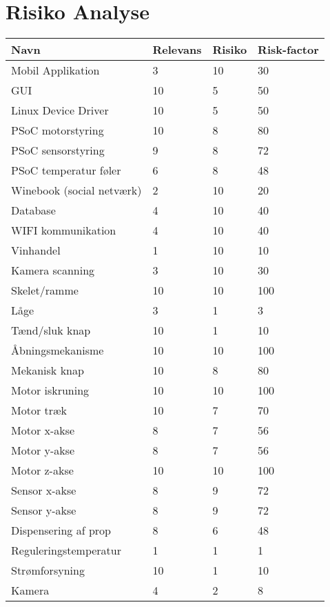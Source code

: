 \section{Risiko Analyse}
\begin{center}
    \begin{tabular}{ | p{5cm} | p{2cm} | p{2cm} | p{2cm}|}
    \hline
    \bfseries {Navn} & \bfseries{Relevans}& \bfseries{Risiko}& \bfseries{Risk-factor}  \\ \hline
    Mobil Applikation & 3 & 10 & 30 \\ \hline
    GUI & 10 & 5 & 50  \\ \hline
    Linux Device Driver& 10& 5 & 50 \\ \hline
	PSoC motorstyring& 10& 8 & 80 \\ \hline
	PSoC sensorstyring& 9 & 8 & 72 \\ \hline
	PSoC temperatur føler& 6 & 8 & 48 \\ \hline
	Winebook (social netværk)& 2& 10 & 20 \\ \hline  
	Database& 4& 10 & 40\\ \hline
	WIFI kommunikation& 4& 10 & 40\\ \hline
	Vinhandel& 1 & 10 & 10\\  \hline 
	Kamera scanning& 3 & 10 & 30\\ \hline
	Skelet/ramme & 10 & 10 & 100\\ \hline
	Låge & 3 & 1 & 3\\ \hline
	Tænd/sluk knap & 10 & 1 & 10\\ \hline
	Åbningsmekanisme & 10 & 10 & 100\\ \hline
	Mekanisk knap & 10 & 8 & 80\\ \hline
	Motor iskruning & 10 & 10 & 100\\ \hline
	Motor træk & 10 & 7 & 70\\ \hline
	Motor x-akse & 8 & 7 & 56\\ \hline
	Motor y-akse & 8 & 7 & 56\\ \hline
	Motor z-akse & 10 & 10 & 100\\ \hline
	Sensor x-akse & 8 & 9 & 72\\ \hline
	Sensor y-akse & 8 & 9 & 72\\ \hline
	Dispensering af prop & 8 & 6 & 48\\ \hline
	Reguleringstemperatur & 1 & 1 & 1\\ \hline
	Strømforsyning & 10 & 1 & 10\\ \hline
	Kamera & 4 & 2 & 8\\ \hline
    \end{tabular}
\end{center}